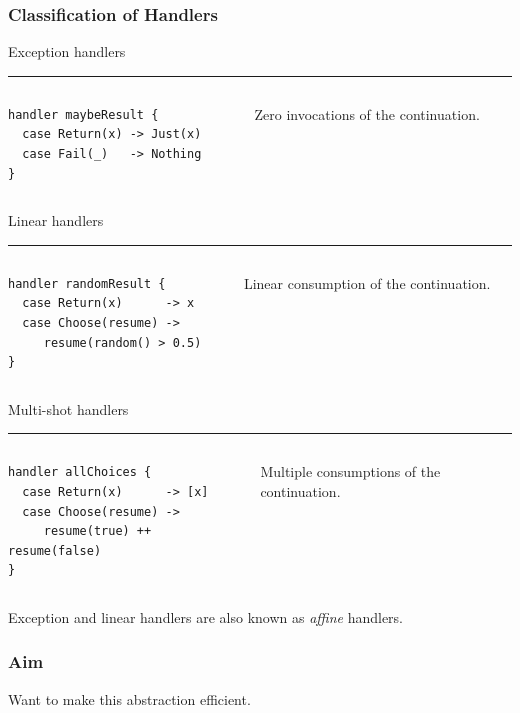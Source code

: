 \documentclass[10pt,compress]{beamer}
\begin{document}
\begin{frame}[fragile]
  \frametitle{Classification of Handlers}
Exception handlers
\hrule
\begin{columns}
\begin{column}{0.6\textwidth}
\begin{lstlisting}
handler maybeResult {
  case Return(x) -> Just(x)
  case Fail(_)   -> Nothing
}
\end{lstlisting}
\end{column}
\hfill
\begin{column}{0.4\textwidth}
Zero invocations of the continuation.
\end{column}
\end{columns}
%

Linear handlers
\hrule
\begin{columns}
\begin{column}{0.6\textwidth}
\begin{lstlisting}
handler randomResult {
  case Return(x)      -> x
  case Choose(resume) -> 
     resume(random() > 0.5)
}
\end{lstlisting}
\end{column}
\hfill
\begin{column}{0.4\textwidth}
Linear consumption of the continuation.
\end{column}
\end{columns}

Multi-shot handlers
\hrule
\begin{columns}
\begin{column}{0.6\textwidth}
\begin{lstlisting}
handler allChoices {
  case Return(x)      -> [x]
  case Choose(resume) -> 
     resume(true) ++ resume(false)
}
\end{lstlisting}
\end{column}
\hfill
\begin{column}{0.4\textwidth}
Multiple consumptions of the continuation.
\end{column}
\end{columns}
Exception and linear handlers are also known as \emph{affine} handlers.
\end{frame}

\begin{frame}
  \frametitle{Aim}
Want to make this abstraction efficient.
\end{frame}
\end{document}
